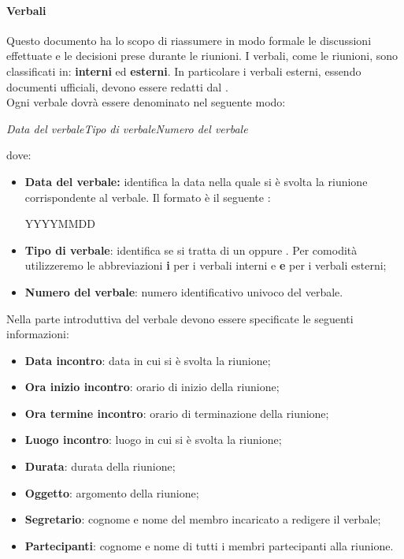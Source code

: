 \paragraph{Verbali}
Questo documento ha lo scopo di riassumere in modo formale le discussioni effettuate e le decisioni
prese durante le riunioni. I verbali, come le riunioni, sono classificati in:
\textbf{interni} ed \textbf{esterni}. In particolare i verbali esterni, essendo
documenti ufficiali, devono essere redatti dal \textit{\RdP}. \\
Ogni verbale dovrà essere denominato nel seguente modo:
\begin{center}
  \textit{{Data del verbale}{Tipo di verbale}{Numero del verbale}}
\end{center}
dove:
\begin{itemize}
  \item \textbf{Data del verbale:} identifica la data nella quale si è svolta la
  riunione corrispondente al verbale. Il formato è il seguente :
  \begin{center}
  YYYYMMDD
  \end{center}
  \item \textbf{Tipo di verbale}: identifica se si tratta di un \textit{\VI} oppure \textit{\VE}.
  Per comodità utilizzeremo le abbreviazioni \textbf{i} per i verbali interni e \textbf{e} per i verbali
  esterni;
  \item \textbf{Numero del verbale}: numero identificativo univoco del verbale.
\end{itemize}
Nella parte introduttiva del verbale devono essere specificate le seguenti informazioni:
\begin{itemize}
  \item \textbf{Data incontro}: data in cui si è svolta la riunione;
  \item \textbf{Ora inizio incontro}: orario di inizio della riunione;
  \item \textbf{Ora termine incontro}: orario di terminazione della riunione;
  \item \textbf{Luogo incontro}: luogo in cui si è svolta la riunione;
  \item \textbf{Durata}: durata della riunione;
  \item \textbf{Oggetto}: argomento della riunione;
  \item \textbf{Segretario}: cognome e nome del membro incaricato a redigere il
  verbale;
  \item \textbf{Partecipanti}: cognome e nome di tutti i membri partecipanti
  alla riunione.
\end{itemize}

